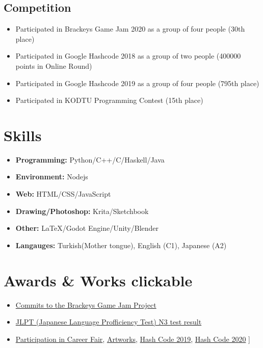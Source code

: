 \documentclass[]{props}
\begin{document}
\subsection{Competition}

\begin{itemize}
    \item[] Participated in Brackeys Game Jam 2020 as a group of four people (30th place)
    \item[] Participated in Google Hashcode 2018 as a group of two people (400000 points in Online Round)
    \item[] Participated in Google Hashcode 2019 as a group of four people (795th place)
    \item[] Participated in KODTU Programming Contest (15th place)
\end{itemize}

\section{Skills}

\begin{itemize}
    \item[] \textbf{Programming:} Python/C++/C/Haskell/Java
    \item[] \textbf{Environment:} Nodejs
    \item[] \textbf{Web:} HTML/CSS/JavaScript
    \item[] \textbf{Drawing/Photoshop:} Krita/Sketchbook
    \item[] \textbf{Other:} LaTeX/Godot Engine/Unity/Blender
    \item[] \textbf{Langauges:} Turkish(Mother tongue), English (C1), Japanese (A2)
\end{itemize}

\section{Awards \& Works \large clickable}

\begin{itemize}
    \item[] \href{https://github.com/necrashter/brackeys-gamejam-2020-1/tree/characters}{Commits to the Brackeys Game Jam Project}
    \item[] \href{https://drive.google.com/open?id=16yZOOhfZm_eP2mYEbTYNsRFo7pMLvGrR}{JLPT (Japanese Language Profficiency Test) N3 test result}
    \item[] \href{https://www.sertifier.com/tr/sertifika-goruntule?CertificateNO=302656629386}{Participation in Career Fair}, \href{https://drive.google.com/drive/folders/1NDm0t0LiOj8a82REVYJCP-nU8ECWvNLB}{Artworks}, \href{https://codingcompetitions.withgoogle.com/hashcode/certificate/round/0000000000050094}{Hash Code 2019}, \href{https://codingcompetitions.withgoogle.com/hashcode/certificate/round/00000000001a006c}{Hash Code 2020}    ] 
\end{itemize}
\end{document}
